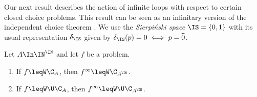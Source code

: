 Our next result describes the action of infinite loops with respect to certain closed choice problems.
This result can be seen as an infinitary version of the independent choice theorem \cite[Theorem~7.2]{BBP12}.
We use the {\em Sierpi\'nski space} $\IS=\{0,1\}$ with its usual representation $\delta_\IS$ given by
$\delta_\IS(p)=0\iff p=\widehat{0}$.

\begin{thm}
\label{thm:independent}
Let $A\In\IN^\IN$ and let $f$ be a problem.
\begin{enumerate}
\item If $f\leqW\C_A$, then $f^\infty\leqW\C_{A^\IN}$.
\item If $f\leqW\U\C_A$, then $f^\infty\leqW\U\C_{A^\IN}$.
\end{enumerate}
\end{thm}

